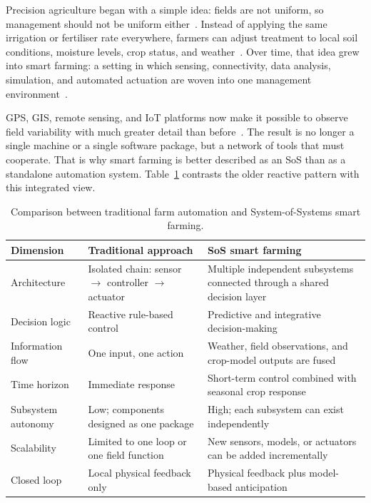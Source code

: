 Precision agriculture began with a simple idea: fields are not uniform, so
management should not be uniform either~\cite{aarzoo2025precision, kushwaha2024precision}.
Instead of applying the same irrigation or fertiliser rate everywhere, farmers
can adjust treatment to local soil conditions, moisture levels, crop status, and
weather~\cite{kushwaha2024precision}. Over time, that idea grew into smart
farming: a setting in which sensing, connectivity, data analysis, simulation,
and automated actuation are woven into one management
environment~\cite{hayat2025iot, jadhav2023smartfarming}.

GPS, GIS, remote sensing, and IoT platforms now make it possible to observe
field variability with much greater detail than before~\cite{sharma2020ml,
adewuyi2024datascience}. The result is no longer a single machine or a single
software package, but a network of tools that must cooperate. That is why smart
farming is better described as an SoS than as a standalone automation
system. Table~\ref{tab:traditional_vs_sos} contrasts the older reactive pattern
with this integrated view.

\begin{table}[ht]
  \centering
  \caption{Comparison between traditional farm automation and System-of-Systems smart farming.}
  \label{tab:traditional_vs_sos}
  \begin{tabular}{p{3.5cm} p{5.3cm} p{5.3cm}}
    \toprule
    \textbf{Dimension} & \textbf{Traditional approach} & \textbf{SoS smart farming} \\
    \midrule
    Architecture &
    Isolated chain: sensor $\rightarrow$ controller $\rightarrow$ actuator &
    Multiple independent subsystems connected through a shared decision layer \\[4pt]

    Decision logic &
    Reactive rule-based control &
    Predictive and integrative decision-making \\[4pt]

    Information flow &
    One input, one action &
    Weather, field observations, and crop-model outputs are fused \\[4pt]

    Time horizon &
    Immediate response &
    Short-term control combined with seasonal crop response \\[4pt]

    Subsystem autonomy &
    Low; components designed as one package &
    High; each subsystem can exist independently \\[4pt]

    Scalability &
    Limited to one loop or one field function &
    New sensors, models, or actuators can be added incrementally \\[4pt]

    Closed loop &
    Local physical feedback only &
    Physical feedback plus model-based anticipation \\
    \bottomrule
  \end{tabular}
\end{table}


